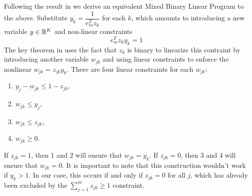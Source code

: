 Following the result in \cite{Li:94} we derive an equivalent Mixed
Binary Linear Program to the above.
Substitute $y_k = \dfrac{1}{e_m^T z_k}$ for each $k$, which amounts to
introducing a new variable $y \in \mathbb{R}^K$ and non-linear constraints
\[ e_m^T z_k y_k = 1 \]
The key theorem in \cite{Li:94} uses the fact that $z_k$ is binary to
linearize this contraint by introducing another variable $w_{jk}$ and
using linear constraints to enforce the nonlinear $w_{jk} = z_{jk} y_k$.
There are four linear constraints for each $w_{jk}$:

\begin{enumerate}
\item
$y_j - w_{jk} \leq 1 - z_{jk}, $
\item
$w_{jk} \leq y_j$,
\item
$w_{jk} \leq z_{jk}$,
\item
$w_{jk} \geq 0$.
\end{enumerate}

If $z_{jk} = 1$, then 1 and 2 will ensure that $w_{jk} = y_k$.
If $z_{jk} = 0$, then 3 and 4 will ensure that $w_{jk} = 0$.
It is important to note that this construction wouldn't work if
$y_k > 1$. In our case, this occurs if and only if $z_{jk} = 0$ for all
$j$, which has already been excluded by the $\sum_{j=1}^m z_{jk} \geq 1$
constraint.

